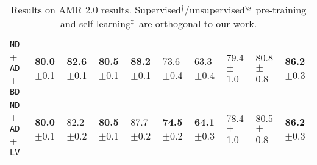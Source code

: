 \documentclass[11pt,a4paper]{article}
\begin{document}
\begin{table*}[t]
\begin{subtable}[t]{\textwidth}
{\begin{tabular}{l||l|l||l|l|l|l|l|l|l}
				\texttt{ND} + \texttt{AD} + \texttt{BD}   & \textbf{80.0}$\pm$0.1 & \textbf{82.6}$\pm$0.1 & \textbf{80.5}$\pm$0.1 & \textbf{88.2}$\pm$0.1 & 73.6$\pm$0.4          & 63.3$\pm$0.4          & 79.4$\pm$1.0          & 80.8$\pm$0.8          & \textbf{86.2}$\pm$0.3 \\
				\texttt{ND} + \texttt{AD} + \texttt{LV} & \textbf{80.0}$\pm$0.1 & 82.2$\pm$0.2          & \textbf{80.5}$\pm$0.1 & 87.7$\pm$0.2          & \textbf{74.5}$\pm$0.2 & \textbf{64.1}$\pm$0.3 & 78.4$\pm$1.0          & 80.5$\pm$0.8          & \textbf{86.2}$\pm$0.3 \\
		\end{tabular}}
		\caption{Results on AMR 2.0 results. Supervised{$^\dagger$}/unsupervised{$^\S$} pre-training and self-learning{$^\ddagger$}\, are orthogonal to our work.}
		\label{tbl:amr2}
    \end{subtable}
    \vspace{0.5em}
    

\end{table*}
\end{document}

